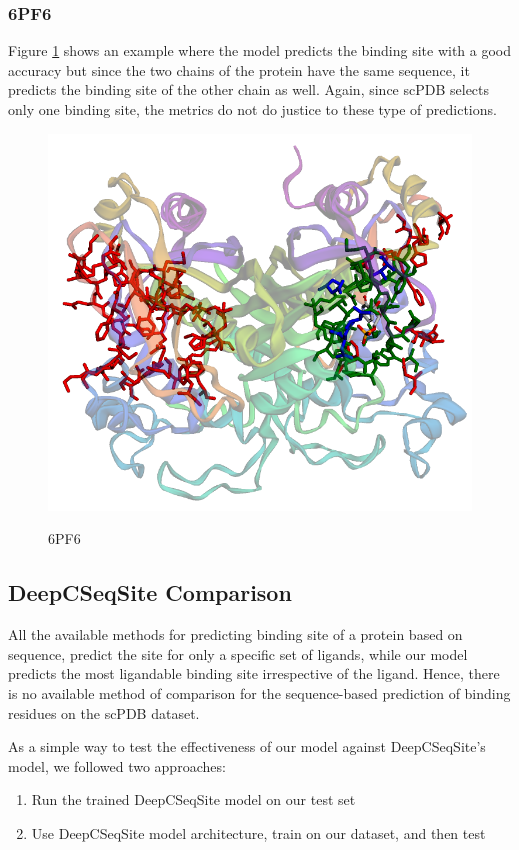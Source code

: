 \documentclass[journal=jacsat,manuscript=article]{achemso}
\begin{document}
\subsubsection{6PF6}
\quad Figure \ref{fig:6pf6} shows an example where the model predicts the binding site with a good accuracy but since the two chains of the protein have the same sequence, it predicts the binding site of the other chain as well. Again, since scPDB selects only one binding site, the metrics do not do justice to these type of predictions.
\begin{figure}
    \caption{\centering 6PF6}
    \centering
    \noindent\includegraphics[scale=0.4]{6pf6.png}
    \label{fig:6pf6}
\end{figure}

\subsection{DeepCSeqSite Comparison}
All the available methods for predicting binding site of a protein based on sequence, predict the site for only a specific set of ligands, while our model predicts the most ligandable binding site irrespective of the ligand. Hence, there is no available method of comparison for the sequence-based prediction of binding residues on the scPDB dataset.

\newpage
As a simple way to test the effectiveness of our model against DeepCSeqSite's model, we followed two approaches:
\begin{enumerate}
    \item Run the trained DeepCSeqSite model on our test set
    \item Use DeepCSeqSite model architecture, train on our dataset, and then test
\end{enumerate}
\end{document}
